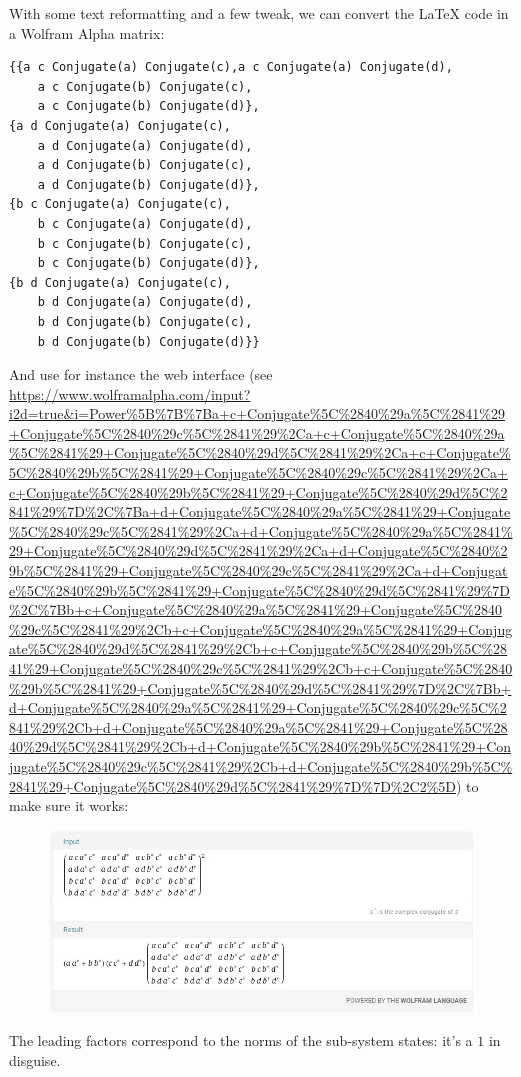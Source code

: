 \documentclass[solutions.tex]{subfiles}
\begin{document}
With some text reformatting and a few tweak, we can convert the \LaTeX
code in a Wolfram Alpha matrix:
\begin{verbatim}
{{a c Conjugate(a) Conjugate(c),a c Conjugate(a) Conjugate(d),
    a c Conjugate(b) Conjugate(c),
    a c Conjugate(b) Conjugate(d)},
{a d Conjugate(a) Conjugate(c),
    a d Conjugate(a) Conjugate(d),
    a d Conjugate(b) Conjugate(c),
    a d Conjugate(b) Conjugate(d)},
{b c Conjugate(a) Conjugate(c),
    b c Conjugate(a) Conjugate(d),
    b c Conjugate(b) Conjugate(c),
    b c Conjugate(b) Conjugate(d)},
{b d Conjugate(a) Conjugate(c),
    b d Conjugate(a) Conjugate(d),
    b d Conjugate(b) Conjugate(c),
    b d Conjugate(b) Conjugate(d)}}
\end{verbatim}

And use for instance the web interface (see \url{https://www.wolframalpha.com/input?i2d=true&i=Power%5B%7B%7Ba+c+Conjugate%5C%2840%29a%5C%2841%29+Conjugate%5C%2840%29c%5C%2841%29%2Ca+c+Conjugate%5C%2840%29a%5C%2841%29+Conjugate%5C%2840%29d%5C%2841%29%2Ca+c+Conjugate%5C%2840%29b%5C%2841%29+Conjugate%5C%2840%29c%5C%2841%29%2Ca+c+Conjugate%5C%2840%29b%5C%2841%29+Conjugate%5C%2840%29d%5C%2841%29%7D%2C%7Ba+d+Conjugate%5C%2840%29a%5C%2841%29+Conjugate%5C%2840%29c%5C%2841%29%2Ca+d+Conjugate%5C%2840%29a%5C%2841%29+Conjugate%5C%2840%29d%5C%2841%29%2Ca+d+Conjugate%5C%2840%29b%5C%2841%29+Conjugate%5C%2840%29c%5C%2841%29%2Ca+d+Conjugate%5C%2840%29b%5C%2841%29+Conjugate%5C%2840%29d%5C%2841%29%7D%2C%7Bb+c+Conjugate%5C%2840%29a%5C%2841%29+Conjugate%5C%2840%29c%5C%2841%29%2Cb+c+Conjugate%5C%2840%29a%5C%2841%29+Conjugate%5C%2840%29d%5C%2841%29%2Cb+c+Conjugate%5C%2840%29b%5C%2841%29+Conjugate%5C%2840%29c%5C%2841%29%2Cb+c+Conjugate%5C%2840%29b%5C%2841%29+Conjugate%5C%2840%29d%5C%2841%29%7D%2C%7Bb+d+Conjugate%5C%2840%29a%5C%2841%29+Conjugate%5C%2840%29c%5C%2841%29%2Cb+d+Conjugate%5C%2840%29a%5C%2841%29+Conjugate%5C%2840%29d%5C%2841%29%2Cb+d+Conjugate%5C%2840%29b%5C%2841%29+Conjugate%5C%2840%29c%5C%2841%29%2Cb+d+Conjugate%5C%2840%29b%5C%2841%29+Conjugate%5C%2840%29d%5C%2841%29%7D%7D%2C2%5D})
to make sure it works:

\begin{figure}[H]
	\includegraphics[width=\textwidth]{rho_square_wolfram.jpg}
	\centering
\end{figure}
\begin{remark} The leading factors correspond to the norms of
the sub-system states: it's a $1$ in disguise.
\end{remark}
\end{document}
